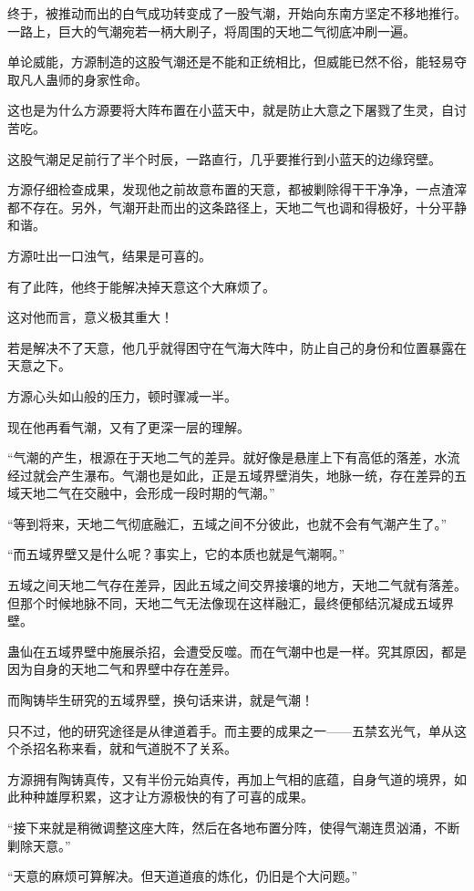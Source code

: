 \begin{this_body}
终于，被推动而出的白气成功转变成了一股气潮，开始向东南方坚定不移地推行。一路上，巨大的气潮宛若一柄大刷子，将周围的天地二气彻底冲刷一遍。

单论威能，方源制造的这股气潮还是不能和正统相比，但威能已然不俗，能轻易夺取凡人蛊师的身家性命。

这也是为什么方源要将大阵布置在小蓝天中，就是防止大意之下屠戮了生灵，自讨苦吃。

这股气潮足足前行了半个时辰，一路直行，几乎要推行到小蓝天的边缘窍壁。

方源仔细检查成果，发现他之前故意布置的天意，都被剿除得干干净净，一点渣滓都不存在。另外，气潮开赴而出的这条路径上，天地二气也调和得极好，十分平静和谐。

方源吐出一口浊气，结果是可喜的。

有了此阵，他终于能解决掉天意这个大麻烦了。

这对他而言，意义极其重大！

若是解决不了天意，他几乎就得困守在气海大阵中，防止自己的身份和位置暴露在天意之下。

方源心头如山般的压力，顿时骤减一半。

现在他再看气潮，又有了更深一层的理解。

“气潮的产生，根源在于天地二气的差异。就好像是悬崖上下有高低的落差，水流经过就会产生瀑布。气潮也是如此，正是五域界壁消失，地脉一统，存在差异的五域天地二气在交融中，会形成一段时期的气潮。”

“等到将来，天地二气彻底融汇，五域之间不分彼此，也就不会有气潮产生了。”

“而五域界壁又是什么呢？事实上，它的本质也就是气潮啊。”

五域之间天地二气存在差异，因此五域之间交界接壤的地方，天地二气就有落差。但那个时候地脉不同，天地二气无法像现在这样融汇，最终便郁结沉凝成五域界壁。

蛊仙在五域界壁中施展杀招，会遭受反噬。而在气潮中也是一样。究其原因，都是因为自身的天地二气和界壁中存在差异。

而陶铸毕生研究的五域界壁，换句话来讲，就是气潮！

只不过，他的研究途径是从律道着手。而主要的成果之一——五禁玄光气，单从这个杀招名称来看，就和气道脱不了关系。

方源拥有陶铸真传，又有半份元始真传，再加上气相的底蕴，自身气道的境界，如此种种雄厚积累，这才让方源极快的有了可喜的成果。

“接下来就是稍微调整这座大阵，然后在各地布置分阵，使得气潮连贯汹涌，不断剿除天意。”

“天意的麻烦可算解决。但天道道痕的炼化，仍旧是个大问题。”


\end{this_body}
